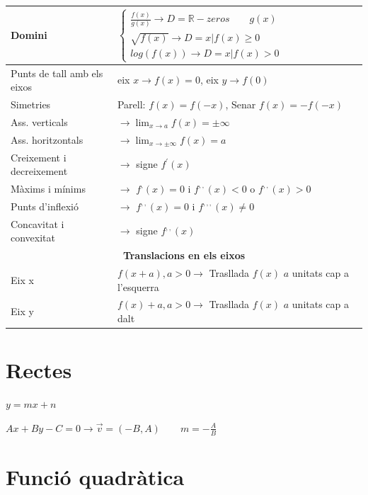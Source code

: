 \documentclass{article}
\begin{document}
\begin{tabular}{|l|l|}
	\hline 
	Domini& $\begin{cases} \frac{f(x)}{g(x)}\rightarrow D=\mathbb{R}-zeros\qquad g(x)\\ \sqrt{f(x)}\rightarrow D=x | f(x) \ge 0\\ log(f(x)) \rightarrow D=x | f(x) > 0 \end{cases}$\\
	\hline
	Punts de tall amb els eixos& eix $x\rightarrow f(x)=0$, eix $y\rightarrow f(0)$\\
	\hline
	Simetries&Parell: $f(x)=f(-x)$,  Senar $f(x)=-f(-x)$\\
	\hline
	Ass. verticals& $\rightarrow \lim_{x\to a }f(x)=\pm \infty$\\
	\hline
	Ass. horitzontals& $\rightarrow \lim_{x\to \pm \infty }f(x)=a$\\
	\hline
	Creixement i decreixement& $\rightarrow$ signe $f^{\prime}(x)$\\
	\hline
	Màxims i mínims& $\rightarrow$ $f^{,}(x)=0$ i $f^{,,}(x)<0$ o $f^{,,}(x)>0$\\
	\hline
	Punts d'inflexió& $\rightarrow$ $f^{,,}(x)=0$ i $f^{,,,}(x)\neq 0$\\
	\hline
	Concavitat i convexitat& $\rightarrow$ signe $f^{,,}(x)$\\
	\hline
	\multicolumn{2}{|c|}{\textbf{Translacions en els eixos}}\\
	\hline
	Eix x& $f(x+a), a>0\rightarrow$ Trasllada $f(x)$ $a$ unitats cap a l'esquerra \\
	\hline
	Eix y& $f(x)+a, a>0\rightarrow$ Trasllada $f(x)$ $a$ unitats cap a dalt\\
	\hline
\end{tabular}

\section{Rectes}


$y=mx+n$


$Ax+By-C=0\rightarrow \overrightarrow{v}=(-B,A)\qquad m=-\frac{A}{B}$

\section{Funció quadràtica}
\end{document}
